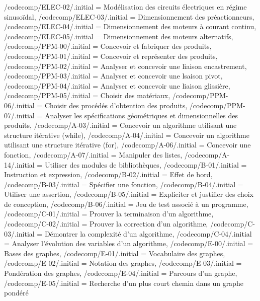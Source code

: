 {	/codecomp/ELEC-02/.initial = Modélisation des circuits électriques en régime sinusoïdal,
	/codecomp/ELEC-03/.initial = Dimensionnement des préactionneurs,
	/codecomp/ELEC-04/.initial = Dimensionnement des moteurs à courant continu,
	/codecomp/ELEC-05/.initial = Dimensionnement des moteurs alternatifs,
	/codecomp/PPM-00/.initial = Concevoir et fabriquer des produits,
	/codecomp/PPM-01/.initial = Concevoir et représenter des produits,
	/codecomp/PPM-02/.initial = Analyser et concevoir une liaison encastrement,
	/codecomp/PPM-03/.initial = Analyser et concevoir une lsaison pivot,
	/codecomp/PPM-04/.initial = Analyser et concevoir une liaison glissière,
	/codecomp/PPM-05/.initial = Choisir des matériaux,
	/codecomp/PPM-06/.initial = Choisir des procédés d'obtention des produits,
	/codecomp/PPM-07/.initial = Analyser les spécifications géométriques et dimensionnelles des produits,
	/codecomp/A-03/.initial = Concevoir un algorithme utilisant une structure itérative (while),
	/codecomp/A-04/.initial = Concevoir un algorithme utilisant une structure itérative (for),
	/codecomp/A-06/.initial = Concevoir une fonction,
	/codecomp/A-07/.initial = Manipuler des listes,
	/codecomp/A-14/.initial = Utiliser des modules de bibliothèques,
	/codecomp/B-01/.initial = Instruction et expression,
	/codecomp/B-02/.initial = Effet de bord,
	/codecomp/B-03/.initial = Spécifier une fonction,
	/codecomp/B-04/.initial = Utiliser une assertion,
	/codecomp/B-05/.initial = Expliciter et justifier des choix de conception,
	/codecomp/B-06/.initial = Jeu de test associé à un programme,
	/codecomp/C-01/.initial = Prouver la terminaison d'un algorithme,
	/codecomp/C-02/.initial = Prouver la correction d'un algorithme,
	/codecomp/C-03/.initial = Démontrer la complexité d'un algorithme,
	/codecomp/C-04/.initial = Analyser l'évolution des variables d'un algorithme,
	/codecomp/E-00/.initial = Bases des graphes,
	/codecomp/E-01/.initial = Vocabulaire des graphes,
	/codecomp/E-02/.initial = Notation des graphes,
	/codecomp/E-03/.initial = Pondération des graphes,
	/codecomp/E-04/.initial = Parcours d'un graphe,
	/codecomp/E-05/.initial = Recherche d'un plus court chemin dans un graphe pondéré
}

\newcommand{\compForCodecomp}[2]{\xpComp{#1}{#2} \pgfkeysvalueof{/codecomp/#1-#2}}


\newcommand{\deuxcolxp}[2]{
\begin{minipage}[c]{1cm} \xpComp{#1}{#2} \end{minipage} \hspace{.3cm} %
\begin{minipage}[c]{8cm} \pgfkeysvalueof{/codecomp/#1-#2}\end{minipage} \\ \vspace{-0.2cm} \\}



